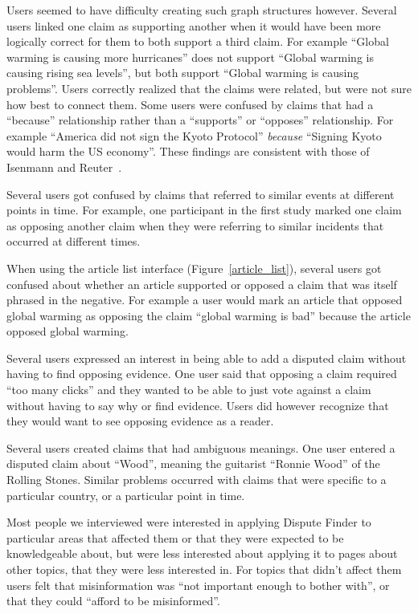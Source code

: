 \documentclass{www2010-submission}
\begin{document}
Users seemed to have difficulty creating such graph structures however. Several users linked one claim as supporting another when it would have been more logically correct for them to both support a third claim. For example ``Global warming is causing more hurricanes'' does not support ``Global warming is causing rising sea levels'', but both support ``Global warming is causing problems''. Users correctly realized that the claims were related, but were not sure how best to connect them. Some users were confused by claims that had a ``because'' relationship rather than a ``supports'' or ``opposes'' relationship. For example ``America did not sign the Kyoto Protocol'' {\it because} ``Signing Kyoto would harm the US economy''. These findings are consistent with those of Isenmann and Reuter~\cite{Isenmann1997}.

Several users got confused by claims that referred to similar events at different points in time. For example, one participant in the first study marked one claim as opposing another claim when they were referring to similar incidents that occurred at different times. 

When using the article list interface (Figure~\ref{article_list}), several users got confused about whether an article supported or opposed a claim that was itself phrased in the negative. For example a user would mark an article that opposed global warming as opposing the claim ``global warming is bad'' because the article opposed global warming.

Several users expressed an interest in being able to add a disputed claim without having to find opposing evidence. One user said that opposing a claim required ``too many clicks'' and they wanted to be able to just vote against a claim without having to say why or find evidence. Users did however recognize that they would want to see opposing evidence as a reader.

Several users created claims that had ambiguous meanings. One user entered a disputed claim about ``Wood'', meaning the guitarist ``Ronnie Wood'' of the Rolling Stones. Similar problems occurred with claims that were specific to a particular country, or a particular point in time. 

Most people we interviewed were interested in applying Dispute Finder to particular areas that affected them or that they were expected to be knowledgeable about, but were less interested about applying it to pages about other topics, that they were less interested in. For topics that didn't affect them users felt that misinformation was ``not important enough to bother with'', or that they could ``afford to be misinformed''.
\end{document}

